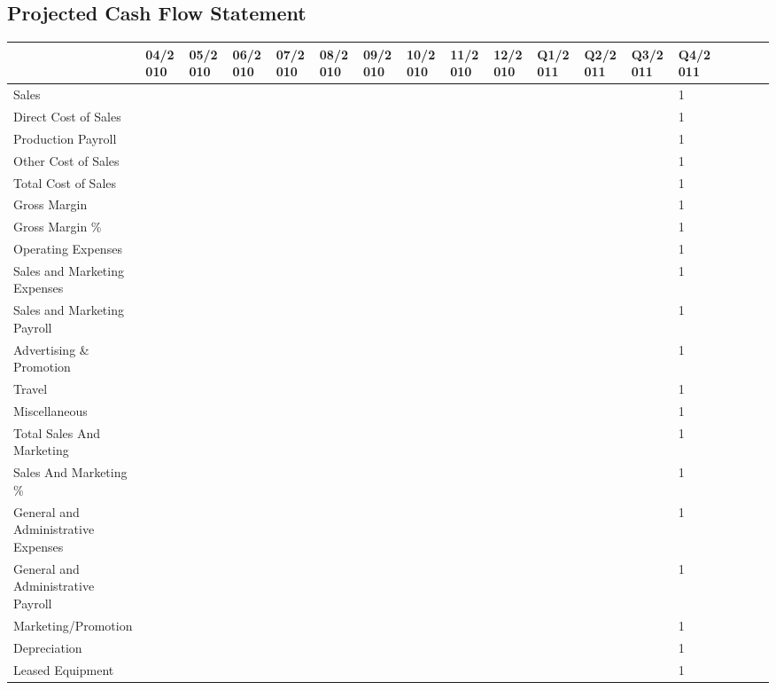 \documentclass[11pt]{article}
\begin{document}
\begin{landscape}
\subsection{Projected Cash Flow Statement}
\begin{scriptsize}
\begin{tabular}{ | l | l | l | l | l | l | l | l | l | l | l | l | l | l | l | l | l | l |}\hline
  & 04/2010 & 05/2010 & 06/2010 & 07/2010 & 08/2010 & 09/2010 & 10/2010 & 11/2010 & 12/2010 & Q1/2011 & Q2/2011 & Q3/2011 & Q4/2011 \\ \hline
  Sales & & & & & & & & & & & & & 1\\ \hline
  Direct Cost of Sales & & & & & & & & & & & & & 1 \\ \hline
  Production Payroll & & & & & & & & & & & & & 1 \\ \hline
  Other Cost of Sales & & & & & & & & & & & & & 1 \\ \hline
  Total Cost of Sales & & & & & & & & & & & & & 1 \\ \hline
  Gross Margin & & & & & & & & & & & & & 1 \\ \hline
  Gross Margin \% & & & & & & & & & & & & & 1 \\ \hline
  Operating Expenses & & & & & & & & & & & & & 1 \\ \hline
  Sales and Marketing Expenses & & & & & & & & & & & & & 1 \\ \hline
  Sales and Marketing Payroll & & & & & & & & & & & & & 1 \\ \hline
  Advertising \& Promotion & & & & & & & & & & & & & 1 \\ \hline
  Travel & & & & & & & & & & & & & 1 \\ \hline
  Miscellaneous & & & & & & & & & & & & & 1 \\ \hline
  Total Sales And Marketing & & & & & & & & & & & & & 1 \\ \hline
  Sales And Marketing \% & & & & & & & & & & & & & 1 \\ \hline
  General and Administrative Expenses & & & & & & & & & & & & & 1 \\ \hline
  General and Administrative Payroll & & & & & & & & & & & & & 1 \\ \hline
  Marketing/Promotion & & & & & & & & & & & & & 1 \\ \hline
  Depreciation & & & & & & & & & & & & & 1 \\ \hline
  Leased Equipment & & & & & & & & & & & & & 1 \\ \hline

\end{tabular}
\end{scriptsize}
\end{landscape}
\end{document}

